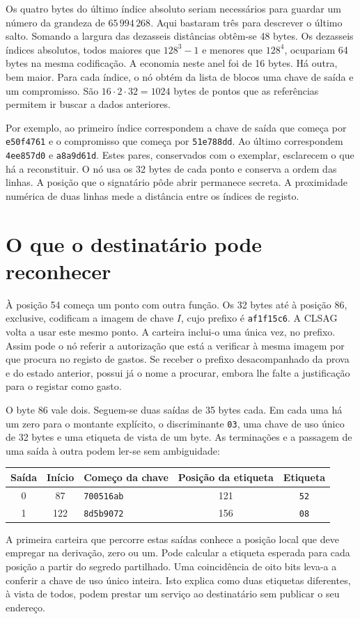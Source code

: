 Os quatro bytes do último índice absoluto seriam necessários para
guardar um número da grandeza de \(65\,994\,268\). Aqui bastaram três
para descrever o último salto. Somando a largura das dezasseis
distâncias obtêm-se 48 bytes. Os dezasseis índices absolutos, todos
maiores que \(128^3-1\) e menores que \(128^4\), ocupariam 64 bytes
na mesma codificação. A economia neste anel foi de 16 bytes.
Há outra, bem maior. Para cada índice, o nó obtém da lista de blocos
uma chave de saída e um compromisso. São \(16\cdot2\cdot32=1024\)
bytes de pontos que as referências permitem ir buscar a dados anteriores.

Por exemplo, ao primeiro índice correspondem a chave de saída que
começa por \texttt{e50f4761} e o compromisso que começa por
\texttt{51e788dd}. Ao último correspondem \texttt{4ee857d0} e
\texttt{a8a9d61d}. Estes pares, conservados com o exemplar, esclarecem
o que há a reconstituir. O nó usa os 32 bytes de cada ponto e
conserva a ordem das linhas. A posição que o signatário pôde abrir
permanece secreta. A proximidade numérica de duas linhas mede a
distância entre os índices de registo.

\section{O que o destinatário pode reconhecer}

À posição 54 começa um ponto com outra função. Os 32 bytes até à
posição 86, exclusive, codificam a imagem de chave \(I\), cujo
prefixo é \texttt{af1f15c6}. A CLSAG volta a usar este mesmo ponto.
A carteira inclui-o uma única vez, no prefixo. Assim pode o nó
referir a autorização que está a verificar à mesma imagem por que
procura no registo de gastos. Se receber o prefixo desacompanhado da
prova e do estado anterior, possui já o nome a procurar, embora lhe
falte a justificação para o registar como gasto.

O byte 86 vale dois. Seguem-se duas saídas de 35 bytes cada. Em
cada uma há um zero para o montante explícito, o discriminante
\texttt{03}, uma chave de uso único de 32 bytes e uma etiqueta de
vista de um byte. As terminações e a passagem de uma saída à outra
podem ler-se sem ambiguidade:
\begin{center}\small
\begin{tabular}{c c l c c}
Saída & Início & Começo da chave & Posição da etiqueta & Etiqueta\\
\hline
0 & 87  & \texttt{700516ab} & 121 & \texttt{52}\\
1 & 122 & \texttt{8d5b9072} & 156 & \texttt{08}
\end{tabular}
\end{center}
A primeira carteira que percorre estas saídas conhece a posição local
que deve empregar na derivação, zero ou um. Pode calcular a etiqueta
esperada para cada posição a partir do segredo partilhado. Uma
coincidência de oito bits leva-a a conferir a chave de uso único
inteira. Isto explica como duas etiquetas diferentes, à vista de todos,
podem prestar um serviço ao destinatário sem publicar o seu endereço.

